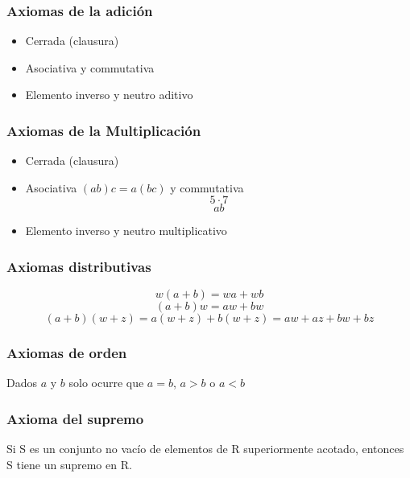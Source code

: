 \documentclass[16pt,]{krantz}
\providecommand{\tightlist}{%
  \setlength{\itemsep}{0pt}\setlength{\parskip}{0pt}}
\theoremstyle{definition}
\theoremstyle{definition}
\theoremstyle{definition}
\theoremstyle{definition}
\theoremstyle{remark}
\begin{document}
\hypertarget{axiomas-de-la-adiciuxf3n}{%
\subsubsection{Axiomas de la adición}\label{axiomas-de-la-adiciuxf3n}}

\begin{itemize}
\tightlist
\item
  Cerrada (clausura)
\item
  Asociativa y commutativa
\item
  Elemento inverso y neutro aditivo
\end{itemize}

\hypertarget{axiomas-de-la-multiplicaciuxf3n}{%
\subsubsection{Axiomas de la Multiplicación}\label{axiomas-de-la-multiplicaciuxf3n}}

\begin{itemize}
\tightlist
\item
  Cerrada (clausura)
\item
  Asociativa \((ab)c=a(bc)\) y commutativa
  \[5\cdot7\]
  \[ab\]
\item
  Elemento inverso y neutro multiplicativo
\end{itemize}

\hypertarget{axiomas-distributivas}{%
\subsubsection{Axiomas distributivas}\label{axiomas-distributivas}}

\[w(a+b)=wa+wb\]
\[(a+b)w=aw+bw\]
\[(a+b)(w+z)=a(w+z)+b(w+z)=aw+az+bw+bz\]

\hypertarget{axiomas-de-orden}{%
\subsubsection{Axiomas de orden}\label{axiomas-de-orden}}

Dados \(a\) y \(b\) solo ocurre que \(a=b\), \(a>b\) o \(a<b\)

\hypertarget{axioma-del-supremo}{%
\subsubsection{Axioma del supremo}\label{axioma-del-supremo}}

Si S es un conjunto no vacío de elementos de R superiormente acotado,
entonces S tiene un supremo en R.
\end{document}
